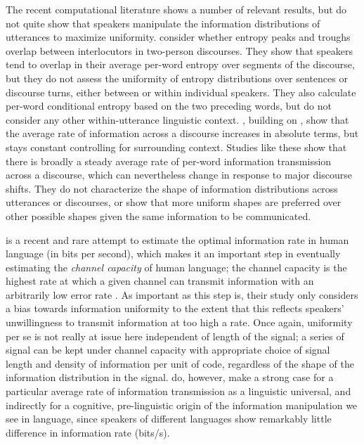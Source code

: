 \documentclass[12pt]{article}
\begin{document}
The recent computational literature shows a number of relevant results, but do not quite show that speakers manipulate the information distributions of utterances to maximize uniformity. \citet{xureitter2016, xureitter2018} consider whether entropy peaks and troughs overlap between interlocutors in two-person discourses. They show that speakers tend to overlap in their average per-word entropy over segments of the discourse, but they do not assess the uniformity of entropy distributions over sentences or discourse turns, either between or within individual speakers. They also calculate per-word conditional entropy based on the two preceding words, but do not consider any other within-utterance linguistic context. \citet{doylefrank2015}, building on \citet{genzelcharniak2002}, show that the average rate of information across a discourse increases in absolute terms, but stays constant controlling for surrounding context. Studies like these show that there is broadly a steady average rate of per-word information transmission across a discourse, which can nevertheless change in response to major discourse shifts. They do not characterize the shape of information distributions across utterances or discourses, or show that more uniform shapes are preferred over other possible shapes given the same information to be communicated.

\citet{coupeetal2019} is a recent and rare attempt to estimate the optimal information rate in human language (in bits per second), which makes it an important step in eventually estimating the \textsl{channel capacity} of human language; the channel capacity is the highest rate at which a given channel can transmit information with an arbitrarily low error rate \citet{shannon1948}. As important as this step is, their study only considers a bias towards information uniformity to the extent that this reflects speakers' unwillingness to transmit information at too high a rate. Once again, uniformity per se is not really at issue here independent of length of the signal; a series of signal can be kept under channel capacity with appropriate choice of signal length and density of information per unit of code, regardless of the shape of the information distribution in the signal. \citet{coupeetal2019} do, however, make a strong case for a particular average rate of information transmission as a linguistic universal, and indirectly for a cognitive, pre-linguistic origin of the information manipulation we see in language, since speakers of different languages show remarkably little difference in information rate (bits/s).
\end{document}
